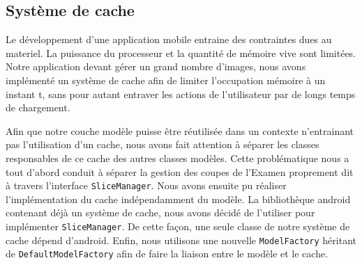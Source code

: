 \subsection{Système de cache}

Le développement d'une application mobile entraine des contraintes dues au materiel. La puissance du processeur et la quantité de mémoire vive sont limitées. Notre application devant gérer un grand nombre d'images, nous avons implémenté un système de cache afin de limiter l'occupation mémoire à un instant t, sans pour autant entraver les actions de l'utilisateur par de longs temps de chargement.

Afin que notre couche modèle puisse être réutilisée dans un contexte n'entrainant pas l'utilisation d'un cache, nous avons fait attention à séparer les classes responsables de ce cache des autres classes modèles. Cette problématique nous a tout d'abord conduit à séparer la gestion des coupes de l'Examen proprement dit à travers l'interface \verb+SliceManager+. Nous avons ensuite pu réaliser l'implémentation du cache indépendamment du modèle. La bibliothèque android contenant déjà un système de cache, nous avons décidé de l'utiliser pour implémenter \verb+SliceManager+. De cette façon, une seule classe de notre système de cache dépend d'android. Enfin, nous utilisons une nouvelle \verb+ModelFactory+ héritant de \verb+DefaultModelFactory+ afin de faire la liaison entre le modèle et le cache.

